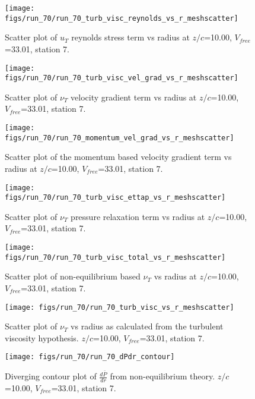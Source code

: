 \begin{figure}[H]
\centering
\texttt{[image: figs/run\_70/run\_70\_turb\_visc\_reynolds\_vs\_r\_meshscatter]}
\caption{Scatter plot of $
u_T$ reynolds stress term vs radius at $z/c$=10.00, $V_{free}$=33.01, station 7.}
\end{figure}


\begin{figure}[H]
\centering
\texttt{[image: figs/run\_70/run\_70\_turb\_visc\_vel\_grad\_vs\_r\_meshscatter]}
\caption{Scatter plot of $\nu_T$ velocity gradient term vs radius at $z/c$=10.00, $V_{free}$=33.01, station 7.}
\end{figure}


\begin{figure}[H]
\centering
\texttt{[image: figs/run\_70/run\_70\_momentum\_vel\_grad\_vs\_r\_meshscatter]}
\caption{Scatter plot of the momentum based velocity gradient term vs radius at $z/c$=10.00, $V_{free}$=33.01, station 7.}
\end{figure}


\begin{figure}[H]
\centering
\texttt{[image: figs/run\_70/run\_70\_turb\_visc\_ettap\_vs\_r\_meshscatter]}
\caption{Scatter plot of $\nu_T$ pressure relaxation term vs radius at $z/c$=10.00, $V_{free}$=33.01, station 7.}
\end{figure}


\begin{figure}[H]
\centering
\texttt{[image: figs/run\_70/run\_70\_turb\_visc\_total\_vs\_r\_meshscatter]}
\caption{Scatter plot of non-equilibrium based $\nu_T$ vs radius at $z/c$=10.00, $V_{free}$=33.01, station 7.}
\end{figure}


\begin{figure}[H]
\centering
\texttt{[image: figs/run\_70/run\_70\_turb\_visc\_vs\_r\_meshscatter]}
\caption{Scatter plot of $\nu_T$ vs radius as calculated from the turbulent viscosity hypothesis. $z/c$=10.00, $V_{free}$=33.01, station 7.}
\end{figure}


\begin{figure}[H]
\centering
\texttt{[image: figs/run\_70/run\_70\_dPdr\_contour]}
\caption{Diverging contour plot of $\frac{d\bar{P}}{dr}$ from non-equilibrium theory. $z/c$=10.00, $V_{free}$=33.01, station 7.}
\end{figure}


